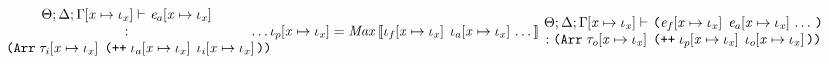 \begin{sproof}
\[{{{        %
      }
      \\\\\\
      {\sequence
        {\parbox{0.5\textwidth}
          {\centering
            \({\sEnv};{\kEnv};{\idxsubst{\tEnv}}\vdash\)
            \({\idxsubst{\expr_a}}\)\\
            \(:{\typearray
              {\idxsubst{\type_i}}
              {\idxappend{\idxsubst{\idx_a} \; \idxsubst{\idx_i}}}}\)}}}
      \\\\\\
      {\idxsubst{\idx_p} =
        \mathit{Max}\llb \idxsubst{\idx_f} \; \sequence{\idxsubst{\idx_a}} \rrb}}
    {\parbox{0.6\textwidth}
      {\centering
        \({\sEnv};{\kEnv};{\idxsubst{\tEnv}}\vdash\)
        \({\app{\idxsubst{\expr_f}}{\sequence{\idxsubst{\expr_a}}}}\)
        \(:{\typearray
          {\idxsubst{\type_o}}
          {\idxappend{\idxsubst{\idx_p} \; \idxsubst{\idx_o}}}}\)}}}\]

\end{sproof}
